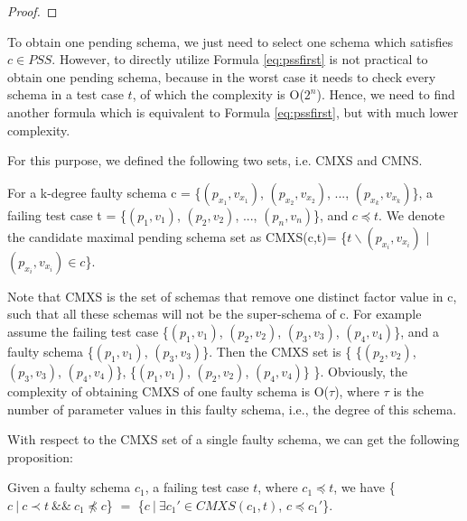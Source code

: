\begin{proof}
\end{proof}

To obtain one pending schema, we just need to select one schema which satisfies $ c \in PSS$. However, to directly utilize Formula \ref{eq:pssfirst} is not practical to obtain one pending schema, because in the worst case it needs to check every schema in a test case $t$, of which the complexity is O($2^{n}$). Hence, we need to find another formula which is equivalent to Formula \ref{eq:pssfirst}, but with much lower complexity.

For this purpose, we defined the following two sets, i.e. CMXS and CMNS.

\begin{definition}
For a k-degree faulty schema c = \{$(p_{x_{1}}, v_{x_{1}})$, $(p_{x_{2}}, v_{x_{2}})$, ..., $(p_{x_{k}}, v_{x_{k}})$\}, a failing test case t = \{$(p_{1}, v_{1})$, $(p_{2}, v_{2})$, ..., $(p_{n}, v_{n})$\}, and $c \preceq t$. We denote the candidate maximal pending schema set as CMXS(c,t)= \{$t \backslash (p_{x_{i}}, v_{x_{i}})$ | $(p_{x_{i}}, v_{x_{i}}) \in c $\}.
\end{definition}

Note that CMXS is the set of schemas that remove one distinct factor value in c, such that all these schemas will not be the super-schema of c. For example assume the failing test case \{$(p_{1}, v_{1})$, $(p_{2}, v_{2})$, $(p_{3}, v_{3})$, $(p_{4}, v_{4})$\}, and a faulty schema \{$(p_{1}, v_{1})$, $(p_{3}, v_{3})$\}. Then the CMXS set is \{ \{$(p_{2}, v_{2})$,  $(p_{3}, v_{3})$, $(p_{4}, v_{4})$\}, \{$(p_{1}, v_{1})$,  $(p_{2}, v_{2})$, $(p_{4}, v_{4})$\} \}. Obviously, the complexity of obtaining CMXS of one faulty schema is O($\tau$), where $\tau$ is the number of parameter values in this faulty schema, i.e., the degree of this schema.

With respect to the CMXS set of a single faulty schema, we can get the following proposition:


\begin{proposition}\label{pro:subofCMXS}
Given a faulty schema $c_{1}$, a failing test case $t$, where $c_{1} \preceq t$, we have \{$c\ |\ c \prec t\ \&\&\ c_{1} \npreceq c$\} $=$  \{$ c\ |\ \exists c_{1}' \in CMXS(c_{1}, t)$, $c \preceq c_{1}'$\}.
\end{proposition}


